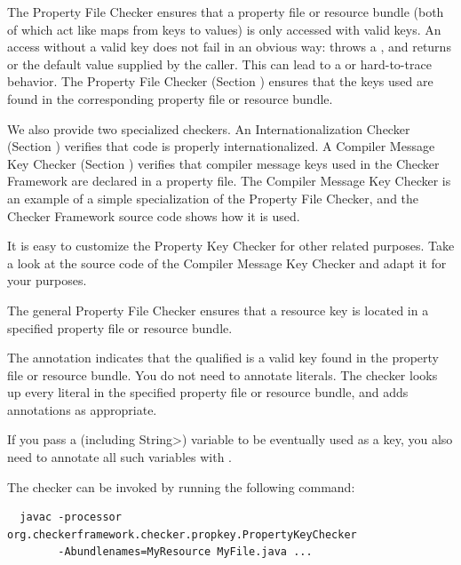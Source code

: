 
The Property File Checker ensures that a property file or resource bundle (both
of which act like maps from keys to values) is only accessed with valid keys.
An access without a valid key does not fail in an obvious way:
 throws a , and
 returns  or the default value supplied
by the caller.  This can lead to a  or
hard-to-trace behavior.
The Property File Checker (Section ) ensures
that the keys used are found in the corresponding property file or resource
bundle.

We also provide two specialized checkers.
An Internationalization Checker (Section )
verifies that code is properly internationalized.
A Compiler Message Key Checker (Section )
verifies that compiler message keys used in the Checker Framework are
declared in a property file.
The Compiler Message Key Checker is an example of a simple specialization of
the Property File Checker, and the Checker Framework source code shows how
it is used.

It is easy to customize the Property Key Checker for other related purposes.
Take a look at the source code of the Compiler Message Key Checker and adapt it for
your purposes.




The general Property File Checker ensures that a resource key is located
in a specified property file or resource bundle.


The annotation 
indicates that the qualified  is a valid key
found in the property file or resource bundle.
You do not need to annotate  literals.
The checker looks up every  literal in the specified
property file or resource bundle, and adds annotations as appropriate.

If you pass a  (including \<String>) variable to be
eventually used as a key, you
also need to annotate all such variables with .


The checker can be invoked by running the following
command:

\begin{Verbatim}
  javac -processor org.checkerframework.checker.propkey.PropertyKeyChecker
        -Abundlenames=MyResource MyFile.java ...
\end{Verbatim}

